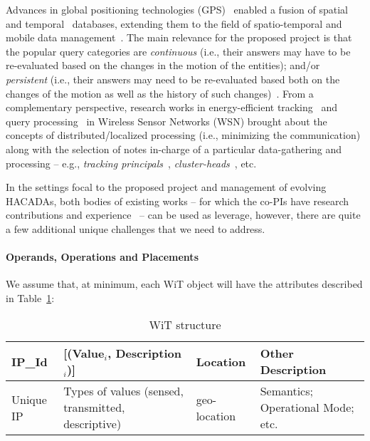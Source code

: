 Advances in global positioning technologies
(GPS)~\cite{MannuciA04} enabled a fusion of spatial~\cite{pelekis-r2,HjaltSamet99,SpatialShashi03}
and temporal~\cite{TemporalBook} databases, extending them
to the field of spatio-temporal and mobile data
management~\cite{MobiEyes2,IndexJensen06,OurGeoInf07,MokbelA08}. The main relevance for the 
proposed project is that the popular query categories 
are \textit{continuous} (i.e., their answers may have to be
re-evaluated based on the changes in the motion of the entities);
and/or \textit{persistent} (i.e., their answers may need to be
re-evaluated based both on the changes of the motion as well as
the history of such
changes)~\cite{OurGeoInf07}. From a complementary perspective, research works in energy-efficient 
tracking~\cite{AvciTS16,LiuS11,RenLC11} and query processing~\cite{MaddenTinyDB06} in Wireless Sensor Networks (WSN)
brought about the concepts of distributed/localized processing (i.e., minimizing the communication) along with the selection of
notes in-charge of a particular data-gathering and processing -- e.g., {\it tracking principals}~\cite{GhicaTZ10}, {\it cluster-heads}~\cite{Kulik99,Tavli06}, etc.

In the settings focal to the proposed project and management of evolving HACADAs, both bodies of existing works -- for which the co-PIs have research contributions and experience~\cite{AvciTS16,OurGeoInf07,GhicaTZ10,MyTODS04,ZhouT+12} -- can be used as leverage, however, there are quite a few additional unique challenges that we need to address.

\paragraph{Operands, Operations and Placements}

We assume that, at minimum, each WiT object will have the attributes described in Table~\ref{tab:table1}:

\begin{table}[h!]
  \centering
  \caption{WiT structure}
  \label{tab:table1}
  \begin{tabular}{l|l|l|l}
    IP\_Id & [(Value$_i$, Description$_i$)] & Location & Other Description\\
    \hline
    Unique IP & Types of values (sensed, transmitted, descriptive) & geo-location & Semantics; Operational Mode; etc.\\
  \end{tabular}
\end{table}

